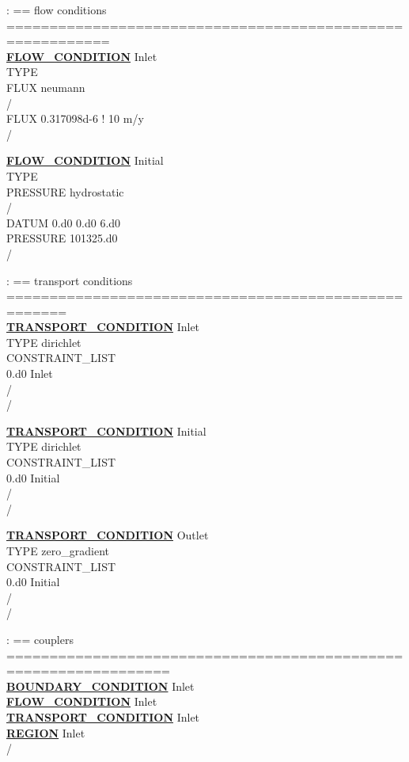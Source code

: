 \documentclass[12pt]{article}
\begin{document}
\noindent
: == flow conditions ==========================================================\\
\hyperlink{target_flow_cond}{\bf FLOW\_CONDITION} Inlet\\
TYPE\\
FLUX neumann\\
/\\
FLUX 0.317098d-6 ! 10 m/y\\
/

\noindent
\hyperlink{target_flow_cond}{\bf FLOW\_CONDITION} Initial\\
TYPE\\
PRESSURE hydrostatic\\
/\\
DATUM 0.d0 0.d0 6.d0\\
PRESSURE 101325.d0\\
/

\noindent
: == transport conditions =====================================================\\
\hyperlink{target_trans_cond}{\bf TRANSPORT\_CONDITION} Inlet\\
TYPE dirichlet\\
CONSTRAINT\_LIST\\
0.d0 Inlet\\
/\\
/

\noindent
\hyperlink{target_trans_cond}{\bf TRANSPORT\_CONDITION} Initial\\
TYPE dirichlet\\
CONSTRAINT\_LIST\\
0.d0 Initial\\
/\\
/

\noindent
\hyperlink{target_trans_cond}{\bf TRANSPORT\_CONDITION} Outlet\\
TYPE zero\_gradient\\
CONSTRAINT\_LIST\\
0.d0 Initial\\
/\\
/

\noindent
: == couplers =================================================================\\
\hyperlink{target_bcon}{\bf BOUNDARY\_CONDITION} Inlet\\
\hyperlink{target_flow_cond}{\bf FLOW\_CONDITION} Inlet\\
\hyperlink{target_trans_cond}{\bf TRANSPORT\_CONDITION} Inlet\\
\hyperlink{target_region}{\bf REGION} Inlet\\
/
\end{document}
